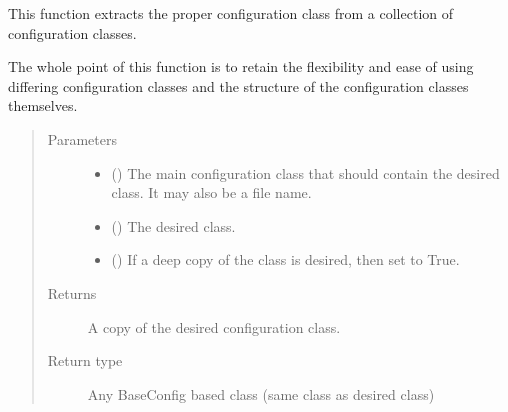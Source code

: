 \documentclass[letterpaper,10pt,english]{sphinxmanual}
\begin{document}

\begin{fulllineitems}
\label{\detokenize{python_docstrings/IfA_Smeargle.yankee.yankee_functions:IfA_Smeargle.yankee.yankee_functions.extract_proper_configuration_class}}
This function extracts the proper configuration class from a
collection of configuration classes.

The whole point of this function is to retain the flexibility and ease
of using differing configuration classes and the structure of the
configuration classes themselves.
\begin{quote}\begin{description}
\item[{Parameters}] \leavevmode\begin{itemize}
\item {} 
 () \textendash{} The main configuration class that should contain the desired class.
It may also be a file name.

\item {} 
 () \textendash{} The desired class.

\item {} 
 (\sphinxstyleliteralemphasis{\sphinxupquote{ (}}\sphinxstyleliteralemphasis{\sphinxupquote{)}}) \textendash{} If a deep copy of the class is desired, then set to True.

\end{itemize}

\item[{Returns}] \leavevmode
{} \textendash{} A copy of the desired configuration class.

\item[{Return type}] \leavevmode
Any BaseConfig based class (same class as desired class)

\end{description}\end{quote}

\end{fulllineitems}
\end{document}
